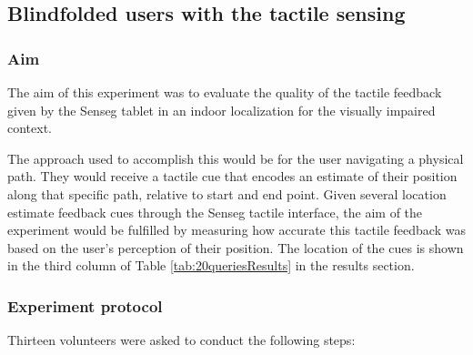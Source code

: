 \subsection{Blindfolded users with the tactile sensing}
\subsubsection{Aim}
The aim of this experiment was to evaluate the quality of the tactile feedback given by the Senseg tablet in an indoor localization for the visually impaired context. 

The approach used to accomplish this would be for the user navigating a physical path. They would receive a tactile cue that encodes an estimate of their position along that specific path, relative to start and end point. Given several location estimate feedback cues through the Senseg tactile interface, the aim of the experiment would be fulfilled by measuring how accurate this tactile feedback was based on the user's perception of their position. The location of the cues is shown in the third column of Table \ref{tab:20queriesResults} in the results section.

\subsubsection{Experiment protocol}
Thirteen volunteers were asked to conduct the following steps:

